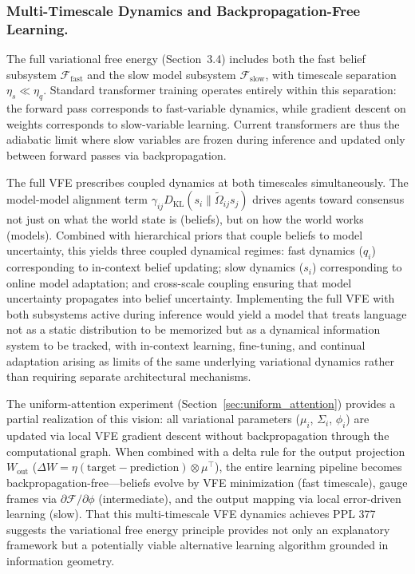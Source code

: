 \documentclass[twoside,11pt]{article}
\begin{document}
\subsubsection{Multi-Timescale Dynamics and Backpropagation-Free Learning.}

The full variational free energy (Section~3.4) includes both the fast belief subsystem $\mathcal{F}_{\text{fast}}$ and the slow model subsystem $\mathcal{F}_{\text{slow}}$, with timescale separation $\eta_s \ll \eta_q$. Standard transformer training operates entirely within this separation: the forward pass corresponds to fast-variable dynamics, while gradient descent on weights corresponds to slow-variable learning. Current transformers are thus the adiabatic limit where slow variables are frozen during inference and updated only between forward passes via backpropagation.

The full VFE prescribes coupled dynamics at both timescales simultaneously. The model-model alignment term $\gamma_{ij} D_{\mathrm{KL}}(s_i \| \tilde{\Omega}_{ij} s_j)$ drives agents toward consensus not just on what the world state is (beliefs), but on how the world works (models). Combined with hierarchical priors that couple beliefs to model uncertainty, this yields three coupled dynamical regimes: fast dynamics ($q_i$) corresponding to in-context belief updating; slow dynamics ($s_i$) corresponding to online model adaptation; and cross-scale coupling ensuring that model uncertainty propagates into belief uncertainty. Implementing the full VFE with both subsystems active during inference would yield a model that treats language not as a static distribution to be memorized but as a dynamical information system to be tracked, with in-context learning, fine-tuning, and continual adaptation arising as limits of the same underlying variational dynamics rather than requiring separate architectural mechanisms.

The uniform-attention experiment (Section~\ref{sec:uniform_attention}) provides a partial realization of this vision: all variational parameters ($\mu_i$, $\Sigma_i$, $\phi_i$) are updated via local VFE gradient descent without backpropagation through the computational graph. When combined with a delta rule for the output projection $W_{\text{out}}$ ($\Delta W = \eta(\text{target} - \text{prediction}) \otimes \mu^\top$), the entire learning pipeline becomes backpropagation-free---beliefs evolve by VFE minimization (fast timescale), gauge frames via $\partial \mathcal{F}/\partial \phi$ (intermediate), and the output mapping via local error-driven learning (slow). That this multi-timescale VFE dynamics achieves PPL 377 suggests the variational free energy principle provides not only an explanatory framework but a potentially viable alternative learning algorithm grounded in information geometry.
\end{document}
